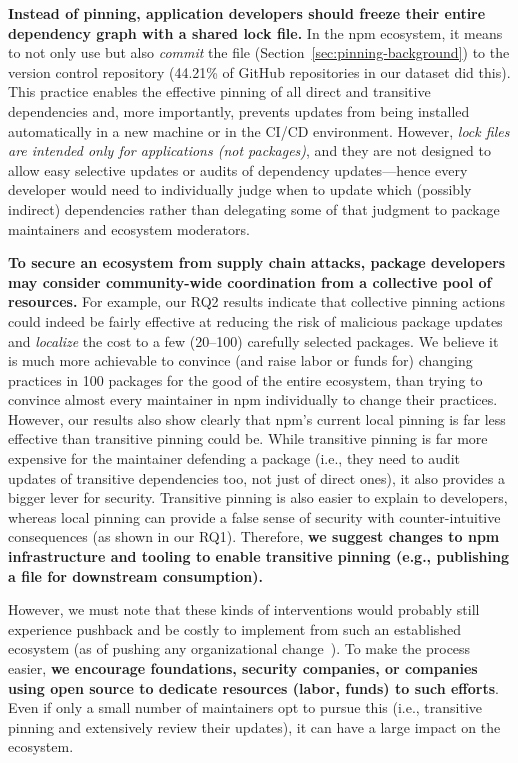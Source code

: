 \textbf{Instead of pinning, application developers should freeze their entire dependency graph with a shared lock file.}
In the npm ecosystem, it means to not only use but also \emph{commit} the  file (Section~\ref{sec:pinning-background}) to the version control repository (44.21\% of GitHub repositories in our dataset did this).
This practice enables the effective pinning of all direct and transitive dependencies and, more importantly, prevents updates from being installed automatically in a new machine or in the CI/CD environment.
However, \emph{lock files are intended only for applications (not packages)}, and they are not designed to allow easy selective updates or audits of dependency updates---hence every developer would need to individually judge when to update which (possibly indirect) dependencies rather than delegating some of that judgment to package maintainers and ecosystem moderators.

\textbf{To secure an ecosystem from supply chain attacks, package developers may consider community-wide coordination from a collective pool of resources.}
For example, our RQ2 results indicate that collective pinning actions could indeed be fairly effective at reducing the risk of malicious package updates and \textit{localize} the cost to a few (20--100) carefully selected packages.
We believe it is much more achievable to convince (and raise labor or funds for) changing practices in 100 packages for the good of the entire ecosystem, than trying to convince almost every maintainer in npm individually to change their practices.
However, our results also show clearly that npm's current local pinning is far less effective than transitive pinning could be. 
While transitive pinning is far more expensive for the maintainer defending a package (i.e., they need to audit updates of transitive dependencies too, not just of direct ones), it also provides a bigger lever for security. 
Transitive pinning is also easier to explain to developers, whereas local pinning can provide a false sense of security with counter-intuitive consequences (as shown in our RQ1).
Therefore, \textbf{we suggest changes to npm infrastructure and tooling to enable transitive pinning (e.g., publishing a  file for downstream consumption).}

However, we must note that these kinds of interventions would probably still experience pushback and be costly to implement from such an established ecosystem (as of pushing any organizational change~\cite{schein2010organizational}).
To make the process easier, \textbf{we encourage foundations, security companies, or companies using open source to dedicate resources (labor, funds) to such efforts}.
Even if only a small number of maintainers opt to pursue this (i.e., transitive pinning and extensively review their updates), it can have a large impact on the ecosystem.

